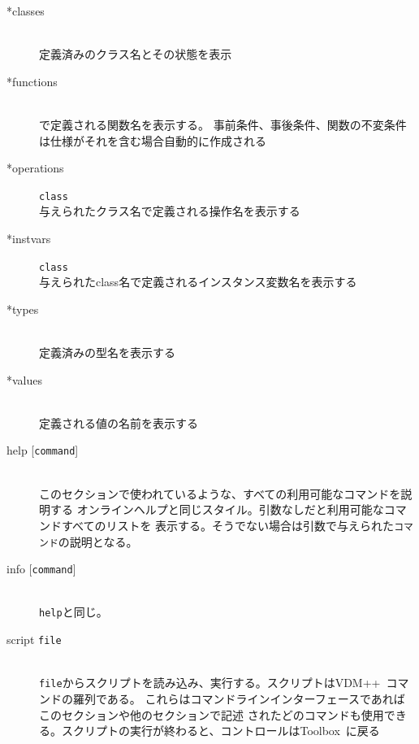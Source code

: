 \documentclass[\pformat,12pt]{jarticle}
\newcommand{\vdmslpp}{VDM++}
\newcommand{\Toolbox}{Toolbox}
\begin{document}
\begin{description}


\item[*classes] \mbox{} \\
  定義済みのクラス名とその状態を表示


\item[*functions]  \mbox{}\\ 
  で定義される関数名を表示する。
  事前条件、事後条件、関数の不変条件は仕様がそれを含む場合自動的に作成される

\item[*operations] {\tt class}\mbox{}\\
  与えられたクラス名で定義される操作名を表示する


\item[*instvars] {\tt class}\mbox{}\\
  与えられたclass名で定義されるインスタンス変数名を表示する


\item[*types] \mbox{}\\ 
  定義済みの型名を表示する

\item[*values] \mbox{}\\ 
  定義される値の名前を表示する

\item[help \mbox{[{\tt command}]}] \mbox{}\\
  このセクションで使われているような、すべての利用可能なコマンドを説明する
  オンラインヘルプと同じスタイル。引数なしだと利用可能なコマンドすべてのリストを
  表示する。そうでない場合は引数で与えられた{\tt コマンド}の説明となる。

\item[info \mbox{[{\tt command}]}] \mbox{}\\
  {\tt help}と同じ。

\item[script {\tt file}] \mbox{}\\
  {\tt file}からスクリプトを読み込み、実行する。スクリプトは\vdmslpp\ コマンドの羅列である。
  これらはコマンドラインインターフェースであればこのセクションや他のセクションで記述
  されたどのコマンドも使用できる。スクリプトの実行が終わると、コントロールは\Toolbox\ に戻る


\end{description}
\end{document}
